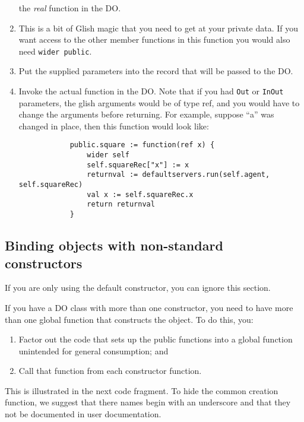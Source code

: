 \begin{enumerate}
        the {\em real} function in the DO.
  \item This is a bit of Glish magic that you need to get at your private
        data. If you want access to the other member functions in this
        function you would also need {\tt wider public}.
  \item Put the supplied parameters into the record that will be passed
        to the DO.
  \item Invoke the actual function in the DO. Note that if you had
        {\tt Out} or {\tt InOut} parameters, the glish arguments would
        be of type ref, and you would have to change the arguments before
        returning. For example, suppose ``a'' was changed in place, then
        this function would look like:
        \begin{verbatim}
            public.square := function(ref x) {
                wider self
                self.squareRec["x"] := x
                returnval := defaultservers.run(self.agent, self.squareRec)
                val x := self.squareRec.x
                return returnval
            }
        \end{verbatim}
\end{enumerate}

\subsection{Binding objects with non-standard constructors}
\label{sec:bindingNSDOs}


If you are only using the default constructor, you can ignore this
section.

If you have a DO class with more than one constructor, you need to
have more than one global function that constructs the object. To do
this, you:
\begin{enumerate}
  \item Factor out the code that sets up the public functions into a
        global function unintended for general consumption; and
  \item Call that function from each constructor function.
\end{enumerate}
This is illustrated in the next code fragment. To hide the
common creation function, we suggest that there names begin with an
underscore and that they not be documented in user documentation.

